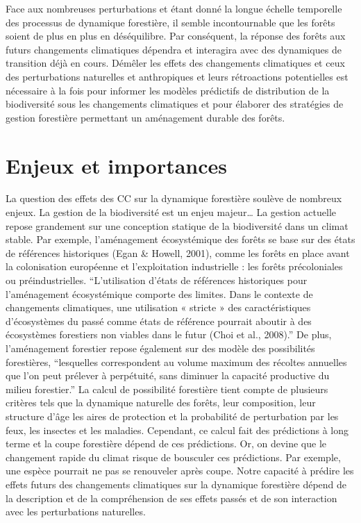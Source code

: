 Face aux nombreuses perturbations et étant donné la longue échelle
temporelle des processus de dynamique forestière, il semble
incontournable que les forêts soient de plus en plus en déséquilibre.
Par conséquent, la réponse des forêts aux futurs changements climatiques
dépendra et interagira avec des dynamiques de transition déjà en cours.
Démêler les effets des changements climatiques et ceux des perturbations
naturelles et anthropiques et leurs rétroactions potentielles est
nécessaire à la fois pour informer les modèles prédictifs de
distribution de la biodiversité sous les changements climatiques et pour
élaborer des stratégies de gestion forestière permettant un aménagement
durable des forêts.

\hypertarget{enjeux-et-importances}{%
\section{Enjeux et importances}\label{enjeux-et-importances}}

La question des effets des CC sur la dynamique forestière soulève de
nombreux enjeux. La gestion de la biodiversité est un enjeu
majeur\ldots{} La gestion actuelle repose grandement sur une conception
statique de la biodiversité dans un climat stable. Par exemple,
l'aménagement écosystémique des forêts se base sur des états de
références historiques (Egan \& Howell, 2001), comme les forêts en place
avant la colonisation européenne et l'exploitation industrielle : les
forêts précoloniales ou préindustrielles. ``L'utilisation d'états de
références historiques pour l'aménagement écosystémique comporte des
limites. Dans le contexte de changements climatiques, une utilisation «
stricte » des caractéristiques d'écosystèmes du passé comme états de
référence pourrait aboutir à des écosystèmes forestiers non viables dans
le futur (Choi et al., 2008).'' De plus, l'aménagement forestier repose
également sur des modèle des possibilités forestières, ``lesquelles
correspondent au volume maximum des récoltes annuelles que l'on peut
prélever à perpétuité, sans diminuer la capacité productive du milieu
forestier.'' La calcul de possibilité forestière tient compte de
plusieurs critères tels que la dynamique naturelle des forêts, leur
composition, leur structure d'âge les aires de protection et la
probabilité de perturbation par les feux, les insectes et les maladies.
Cependant, ce calcul fait des prédictions à long terme et la coupe
forestière dépend de ces prédictions. Or, on devine que le changement
rapide du climat risque de bousculer ces prédictions. Par exemple, une
espèce pourrait ne pas se renouveler après coupe. Notre capacité à
prédire les effets futurs des changements climatiques sur la dynamique
forestière dépend de la description et de la compréhension de ses effets
passés et de son interaction avec les perturbations naturelles.

